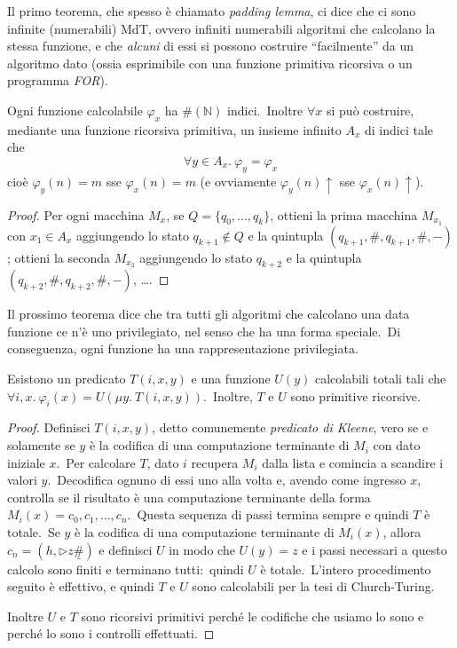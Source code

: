 \medskip

\noindent Il primo teorema, che spesso è chiamato \textit{padding lemma}, ci dice che ci sono infinite (numerabili) MdT, ovvero infiniti numerabili algoritmi che calcolano la stessa funzione, e che \textit{alcuni} di essi si possono costruire ``facilmente'' da un algoritmo dato (ossia esprimibile con una funzione primitiva ricorsiva o un programma \textit{\footnotesize FOR}).

\begin{theorem}
    \label{padding lemma}
    Ogni funzione calcolabile $\varphi_x$ ha $\#(\mathbb{N})$ indici.\
    Inoltre $\forall x$ si può costruire, mediante una funzione ricorsiva primitiva, un insieme infinito $A_x$ di indici tale che
    \[\forall y \in  A_x.\ \varphi_y = \varphi_x\]
    cioè $\varphi_y(n) = m$ sse $\varphi_x(n) = m$ (e ovviamente $\varphi_y(n) \uparrow$ sse $\varphi_x(n) \uparrow$).
\end{theorem}

\begin{proof}
    Per ogni macchina $M_x$, se $Q = \{q_0,\dots,q_k\}$, ottieni la prima macchina $M_{x_1}$ con $x_1 \in A_x$ aggiungendo lo stato $q_{k+1} \notin Q$ e la quintupla $(q_{k+1}, \#, q_{k+1}, \#, -)$; ottieni la seconda $M_{x_2}$ aggiungendo lo stato $q_{k+2}$ e la quintupla $(q_{k+2}, \#, q_{k+2}, \#, -)$, \dots.
\end{proof}

\noindent Il prossimo teorema dice che tra tutti gli algoritmi che calcolano una data funzione ce n'è uno privilegiato, nel senso che ha una forma speciale.\
Di conseguenza, ogni funzione ha una rappresentazione privilegiata.\

\begin{theorem}
    \label{forma normale}
    Esistono un predicato $T(i,x,y)$ e una funzione $U(y)$ calcolabili totali tali che $\forall i,x.\ \varphi_i(x) = U(\mu y.\ T(i,x,y))$.\
    Inoltre, $T$ e $U$ sono primitive ricorsive.\
\end{theorem}

\begin{proof}
    Definisci $T(i, x, y)$, detto comunemente \textit{predicato di Kleene},
    vero se e solamente se $y$ è la codifica di una computazione terminante di $M_i$ con dato iniziale $x$.\
    Per calcolare $T$, dato $i$ recupera $M_i$ dalla lista e comincia a scandire i valori $y$.\
    Decodifica ognuno di essi uno alla volta e, avendo come ingresso $x$, controlla se il risultato è una computazione terminante della    forma $M_i(x) = c_0, c_1,\dots, c_n$.\
    Questa sequenza di passi termina sempre e quindi $T$ è totale.\
    Se $y$ è la codifica di una computazione terminante di $M_i(x)$, allora $c_n = (h, \triangleright z \underline{\#})$ e definisci $U$ in modo che $U(y) = z$ e i passi necessari a questo calcolo sono finiti e terminano tutti:\ quindi $U$ è totale.\
    L'intero procedimento seguito è effettivo, e quindi $T$ e $U$ sono calcolabili per la tesi di Church-Turing.

    Inoltre $U$ e $T$ sono ricorsivi primitivi perché le codifiche che usiamo lo sono e perché lo sono i controlli effettuati.
\end{proof}

